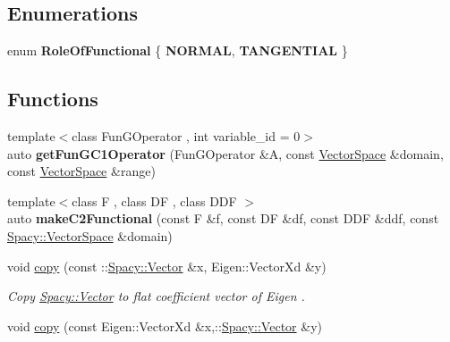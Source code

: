 \subsection*{Enumerations}
\begin{DoxyCompactItemize}
\item 
enum {\bfseries Role\-Of\-Functional} \{ {\bfseries N\-O\-R\-M\-A\-L}, 
{\bfseries T\-A\-N\-G\-E\-N\-T\-I\-A\-L}
 \}
\end{DoxyCompactItemize}
\subsection*{Functions}
\begin{DoxyCompactItemize}
\item 
\hypertarget{namespaceSpacy_1_1Rn_aacc9740ee75c297efc51f7cdfbe5608d}{{\footnotesize template$<$class Fun\-G\-Operator , int variable\-\_\-id = 0$>$ }\\auto {\bfseries get\-Fun\-G\-C1\-Operator} (Fun\-G\-Operator \&A, const \hyperlink{classSpacy_1_1VectorSpace}{Vector\-Space} \&domain, const \hyperlink{classSpacy_1_1VectorSpace}{Vector\-Space} \&range)}\label{namespaceSpacy_1_1Rn_aacc9740ee75c297efc51f7cdfbe5608d}

\item 
\hypertarget{namespaceSpacy_1_1Rn_af1d4ad0f90654bf2e6d3a9a2d3e5ffd1}{{\footnotesize template$<$class F , class D\-F , class D\-D\-F $>$ }\\auto {\bfseries make\-C2\-Functional} (const F \&f, const D\-F \&df, const D\-D\-F \&ddf, const \hyperlink{classSpacy_1_1VectorSpace}{Spacy\-::\-Vector\-Space} \&domain)}\label{namespaceSpacy_1_1Rn_af1d4ad0f90654bf2e6d3a9a2d3e5ffd1}

\item 
\hypertarget{namespaceSpacy_1_1Rn_a26ee11182adb7a8103aa502c4bb8a134}{void \hyperlink{namespaceSpacy_1_1Rn_a26ee11182adb7a8103aa502c4bb8a134}{copy} (const \-::\hyperlink{classSpacy_1_1Vector}{Spacy\-::\-Vector} \&x, Eigen\-::\-Vector\-Xd \&y)}\label{namespaceSpacy_1_1Rn_a26ee11182adb7a8103aa502c4bb8a134}

\begin{DoxyCompactList}\small\item\em Copy \hyperlink{classSpacy_1_1Vector}{Spacy\-::\-Vector} to flat coefficient vector of Eigen . \end{DoxyCompactList}\item 
\hypertarget{namespaceSpacy_1_1Rn_aa1b7ffd8e9af414e4e5118f39971ecc4}{void \hyperlink{namespaceSpacy_1_1Rn_aa1b7ffd8e9af414e4e5118f39971ecc4}{copy} (const Eigen\-::\-Vector\-Xd \&x,\-::\hyperlink{classSpacy_1_1Vector}{Spacy\-::\-Vector} \&y)}\label{namespaceSpacy_1_1Rn_aa1b7ffd8e9af414e4e5118f39971ecc4}


\end{DoxyCompactItemize}
